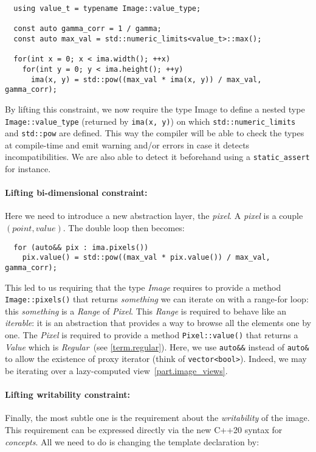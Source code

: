 \begin{verbatim}
  using value_t = typename Image::value_type;

  const auto gamma_corr = 1 / gamma;
  const auto max_val = std::numeric_limits<value_t>::max();

  for(int x = 0; x < ima.width(); ++x)
    for(int y = 0; y < ima.height(); ++y)
      ima(x, y) = std::pow((max_val * ima(x, y)) / max_val, gamma_corr);
\end{verbatim}

\noindent By lifting this constraint, we now require the type Image to define a nested type \texttt{Image::value\_type}
(returned by \texttt{ima(x, y)}) on which \texttt{std::numeric\_limits} and \texttt{std::pow} are defined. This way the
compiler will be able to check the types at compile-time and emit warning and/or errors in case it detects
incompatibilities. We are also able to detect it beforehand using a \texttt{static\_assert} for instance.



\paragraph{Lifting bi-dimensional constraint:}
Here we need to introduce a new abstraction layer, the \emph{pixel}. A \emph{pixel} is a couple $(point, value)$. The
double loop then becomes:

\begin{verbatim}
  for (auto&& pix : ima.pixels())
    pix.value() = std::pow((max_val * pix.value()) / max_val, gamma_corr);
\end{verbatim}

\noindent This led to us requiring that the type \emph{Image} requires to provide a method \texttt{Image::pixels()} that
returns \emph{something} we can iterate on with a range-for loop: this \emph{something} is a \emph{Range} of
\emph{Pixel}. This \emph{Range} is required to behave like an \emph{iterable}: it is an abstraction that provides a way
to browse all the elements one by one. The \emph{Pixel} is required to provide a method \texttt{Pixel::value()} that
returns a \emph{Value} which is \emph{Regular}~(see \cref{term.regular}). Here, we use \texttt{auto\&\&} instead of
\texttt{auto\&} to allow the existence of proxy iterator (think of \texttt{vector<bool>}). Indeed, we may be iterating
over a lazy-computed view~\ref{part.image_views}.



\paragraph{Lifting writability constraint:}
Finally, the most subtle one is the requirement about the \emph{writability} of the image. This requirement can be
expressed directly via the new C++20 syntax for \emph{concepts}. All we need to do is changing the template declaration
by:

